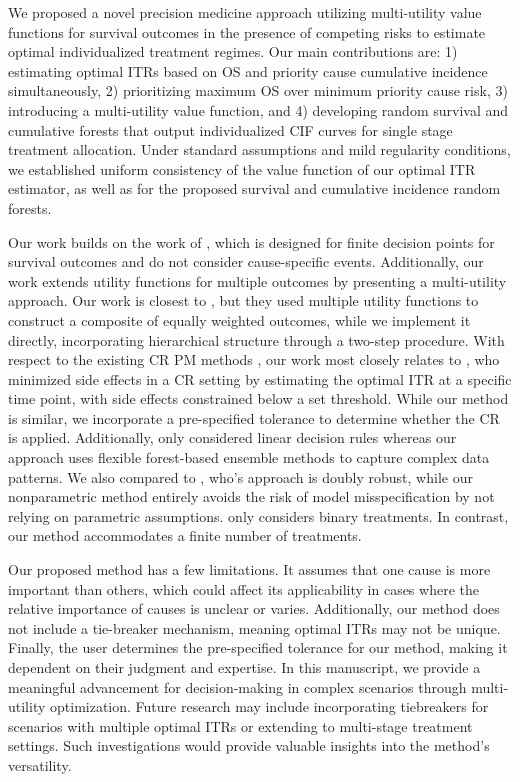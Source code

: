 We proposed a novel precision medicine approach utilizing multi-utility value functions for survival outcomes in the presence of competing risks  to estimate optimal individualized treatment regimes. Our main contributions are: 1) estimating optimal ITRs based on OS and priority cause cumulative incidence simultaneously, 2) prioritizing maximum OS over minimum priority cause risk, 3) introducing a multi-utility value function, and 4) developing random survival and cumulative forests that output individualized CIF curves for single stage treatment allocation. Under standard assumptions and mild regularity conditions, we established uniform consistency of the value function of our optimal ITR estimator, as well as for the proposed survival and cumulative incidence random forests.

Our work builds on the work of \cite{cho_multi-stage_2023}, which is designed for finite decision points for survival outcomes and do not consider cause-specific events.
Additionally, our work extends utility functions for multiple outcomes \citep{Butler2018,jiang_precision_2021,zitovsky2023} by presenting a multi-utility approach. Our work is closest to \cite{jiang_precision_2021}, but they used multiple utility functions to construct a composite of equally weighted outcomes, while we implement it directly, incorporating hierarchical structure through a two-step procedure.
With respect to the existing CR PM methods \citep{friedenreich_physical_2016, yavuz_estimating_2018,chen_cumulative_2020,morzywolek_timing_2022}, our work most closely relates to \cite{zhou_restricted_2021}, who minimized side effects in a CR setting by estimating the optimal ITR at a specific time point, with side effects constrained below a set threshold. While our method is similar, we incorporate a pre-specified tolerance to determine whether the CR is applied. Additionally, \cite{zhou_restricted_2021} only considered linear decision rules whereas our approach uses flexible forest-based ensemble methods to capture complex data patterns. We also compared to \cite{he_optimal_2021}, who’s approach is doubly robust, while our nonparametric method entirely avoids the risk of model misspecification by not relying on parametric assumptions. \cite{he_optimal_2021} only considers binary treatments. In contrast, our method accommodates a finite number of treatments. 

Our proposed method has a few limitations. It assumes that one cause is more important than others, which could affect its applicability in cases where the relative importance of causes is unclear or varies. Additionally, our method does not include a tie-breaker mechanism, meaning optimal ITRs may not be unique. Finally, the user determines the pre-specified tolerance for our method, making it dependent on their judgment and expertise.
In this manuscript, we provide a meaningful advancement for decision-making in complex scenarios through multi-utility optimization. Future research may include incorporating tiebreakers for scenarios with multiple optimal ITRs or extending to multi-stage treatment settings. Such investigations would provide valuable insights into the method’s versatility. 
